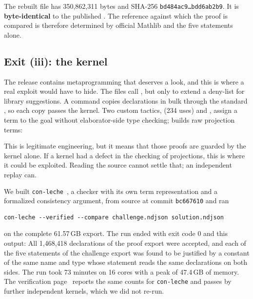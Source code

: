 \begin{verdictbox}
The rebuilt file has 350,862,311 bytes and SHA-256 \texttt{bd484ac9…bdd6ab2b9}. It is \textbf{byte-identical} to the published .
The reference against which the proof is compared is therefore determined by official Mathlib and the five statements alone.
\end{verdictbox}

\subsection{Exit (iii): the kernel}
\label{sec:conleche}

The release contains metaprogramming that deserves a look, and this is where a real exploit would have to hide.
The files  call , but only to extend a deny-list for library suggestions.
A command  copies declarations in bulk through the standard , so each copy passes the kernel.
Two custom tactics,  (234 uses) and , assign a term to the goal without elaborator-side type checking;  builds raw projection terms:


This is legitimate engineering, but it means that those proofs are guarded by the kernel alone. If a kernel had a defect in the checking of projections, this is where it could be exploited.
Reading the source cannot settle that; an independent replay can.

We built \texttt{con-leche}~\cite{conleche}, a checker with its own term representation and a formalized consistency argument, from source at commit \texttt{bc667610} and ran
\begin{Verbatim}[fontsize=\small,frame=single,rulecolor=\color{gray!50}]
con-leche --verified --compare challenge.ndjson solution.ndjson
\end{Verbatim}
\noindent on the complete 61.57\,GB export. The run ended with exit code 0 and this output:
\noindent All 1,468,418 declarations of the proof export were accepted, and each of the five statements of the challenge export was found to be justified by a constant of the same name and type whose statement reads the same declarations on both sides.
The run took 73 minutes on 16 cores with a peak of 47.4\,GB of memory. The verification page~\cite{mit} reports the same counts for \texttt{con-leche} and passes by further independent kernels, which we did not re-run.

